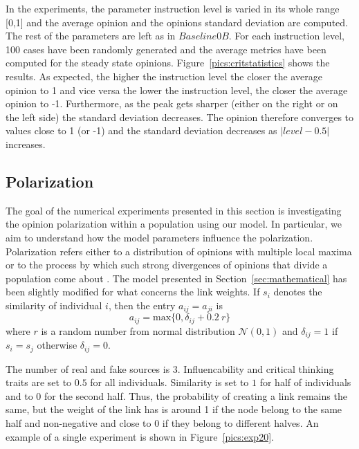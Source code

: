 In the experiments, the parameter instruction level is varied in its whole range [0,1] and the average opinion and the opinions standard deviation are computed. The rest of the parameters are left as in $Baseline0B$. For each instruction level, 100 cases have been randomly generated and the average metrics have been computed for the steady state opinions.
Figure~\ref{pics:critstatistics} shows the results. As expected, the higher the instruction level the closer the average opinion to 1 and vice versa the lower the instruction level, the closer the average opinion to -1. Furthermore, as the peak gets sharper (either on the right or on the left side) the standard deviation decreases. The opinion therefore converges to values close to 1 (or -1) and the standard deviation decreases as $|level-0.5|$ increases. 

\subsection{Polarization}

The goal of the numerical experiments presented in this section is investigating the opinion polarization within a population using our model. In particular, we aim to understand how the model parameters influence the polarization. 
Polarization refers either to a distribution of opinions with multiple local maxima or to the process by which such strong divergences of opinions that divide a population come about \cite{Banisch2019}\cite{Bramsona2016}. The model presented in Section~\ref{sec:mathematical} has been slightly modified for what concerns the link weights. If $s_i$ denotes the similarity of individual $i$, then the entry $a_{ij} = a_{ji}$ is 
\begin{equation}
a_{ij} = \text{max}\{0, \delta_{ij} + 0.2\ r\}
\end{equation}
where $r$ is a random number from normal distribution $\mathcal{N}(0,1)$ and $\delta_{ij} = 1$ if $s_i = s_j$ otherwise $\delta_{ij} = 0$. 

The number of real and fake sources is 3. Influencability and critical thinking traits are set to $0.5$ for all individuals. Similarity is set to $1$ for half of individuals and to $0$ for the second half. Thus, the probability of creating a link remains the same, but the weight of the link has is around 1 if the node belong to the same half and non-negative and close to 0 if they belong to different halves. An example of a single experiment is shown in Figure~\ref{pics:exp20}.\\

